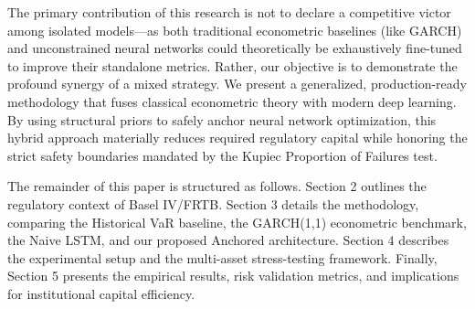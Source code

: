 The primary contribution of this research is not to declare a competitive victor among isolated models---as both traditional econometric baselines (like GARCH) and unconstrained neural networks could theoretically be exhaustively fine-tuned to improve their standalone metrics. Rather, our objective is to demonstrate the profound synergy of a mixed strategy. We present a generalized, production-ready methodology that fuses classical econometric theory with modern deep learning. By using structural priors to safely anchor neural network optimization, this hybrid approach materially reduces required regulatory capital while honoring the strict safety boundaries mandated by the Kupiec Proportion of Failures test.

The remainder of this paper is structured as follows. Section 2 outlines the regulatory context of Basel IV/FRTB. Section 3 details the methodology, comparing the Historical VaR baseline, the GARCH(1,1) econometric benchmark, the Naive LSTM, and our proposed Anchored architecture. Section 4 describes the experimental setup and the multi-asset stress-testing framework. Finally, Section 5 presents the empirical results, risk validation metrics, and implications for institutional capital efficiency.